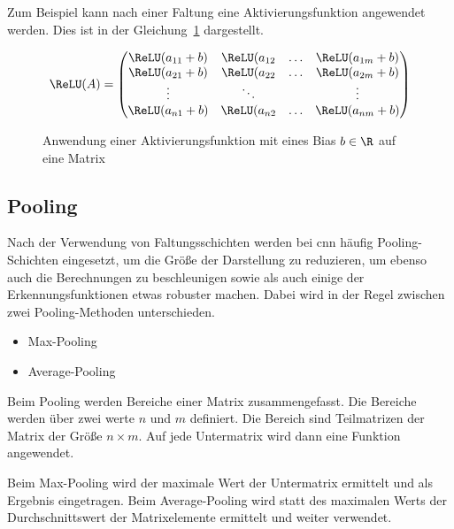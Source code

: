 Zum Beispiel kann nach einer Faltung eine Aktivierungsfunktion angewendet werden. Dies ist in der Gleichung~\ref{concept:AktivierungMatrix} dargestellt.


    \begin{figure}
    
    $$
      \ReLU(A) 
      = 
      \left(
        \begin{matrix}
          \ReLU(a_{11}+b) & \ReLU(a_{12} & \ldots & \ReLU(a_{1m}+b)\\
          \ReLU(a_{21}+b) & \ReLU(a_{22} & \ldots & \ReLU(a_{2m}+b)\\
             \vdots       & \ddots       &        &   \vdots \\
          \ReLU(a_{n1}+b) & \ReLU(a_{n2} & \ldots & \ReLU(a_{nm}+b)\\
    \end{matrix}
    \right)
    $$
    
    \caption{Anwendung einer Aktivierungsfunktion mit eines Bias $b \in \R$ auf eine Matrix}\label{concept:AktivierungMatrix}
    
\end{figure}





\subsection{Pooling}


Nach der Verwendung von Faltungsschichten werden bei \ac{cnn} häufig Pooling-Schichten eingesetzt, um die Größe der Darstellung zu reduzieren, um ebenso auch die Berechnungen zu beschleunigen sowie als auch einige der Erkennungsfunktionen etwas robuster machen. Dabei wird in der Regel zwischen zwei Pooling-Methoden unterschieden.

\begin{itemize}
  \item Max-Pooling
  \item Average-Pooling
\end{itemize}

Beim Pooling werden Bereiche einer Matrix zusammengefasst. Die Bereiche werden über zwei werte $n$ und $m$ definiert. Die Bereich sind Teilmatrizen der Matrix der Größe $n \times m$. Auf jede Untermatrix wird dann eine Funktion angewendet.

Beim Max-Pooling wird der maximale Wert der Untermatrix ermittelt und als Ergebnis eingetragen. Beim Average-Pooling wird statt des maximalen Werts der Durchschnittswert der Matrixelemente ermittelt und weiter verwendet.



